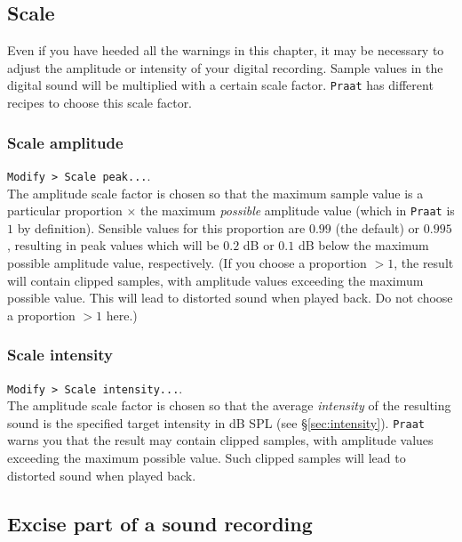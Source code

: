 \documentclass[
]{book}
\begin{document}
\subsection{Scale}\label{scale}

Even if you have heeded all the warnings in this chapter, it may be necessary to adjust the amplitude or intensity of your digital recording. Sample values in the digital sound will be multiplied with a certain scale factor. \texttt{Praat} has different recipes to choose this scale factor.

\protect{}\label{box-praatscale}
\subsubsection{Scale amplitude}\label{scale-amplitude}

\texttt{Modify\ \textgreater{}\ Scale\ peak...}.\\
The amplitude scale factor is chosen so that the maximum sample value is a particular proportion \(\times\) the maximum \emph{possible} amplitude value (which in \texttt{Praat} is \(1\) by definition). Sensible values for this proportion are \(0.99\) (the default) or \(0.995\), resulting in peak values which will be \(0.2\) dB or \(0.1\) dB below the maximum possible amplitude value, respectively. (If you choose a proportion \(>1\), the result will contain clipped samples, with amplitude values exceeding the maximum possible value. This will lead to distorted sound when played back. Do not choose a proportion \(>1\) here.)

\subsubsection{Scale intensity}\label{scale-intensity}

\texttt{Modify\ \textgreater{}\ Scale\ intensity...}.\\
The amplitude scale factor is chosen so that the average \emph{intensity} of the resulting sound is the specified target intensity in dB SPL (see §\ref{sec:intensity}). \texttt{Praat} warns you that the result may contain clipped samples, with amplitude values exceeding the maximum possible value. Such clipped samples will lead to distorted sound when played back.

\subsection{Excise part of a sound recording}\label{sec:praatsoundeditor}
\end{document}
